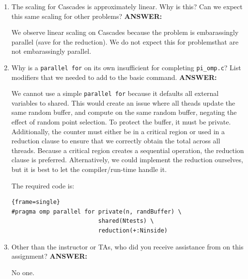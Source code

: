 \documentclass[letter]{article}
\begin{document}
\begin{enumerate}
        \item The scaling for Cascades is approximately linear. Why is this? Can we expect this same scaling for other problems?
        \textbf{ANSWER:} %

        We observe linear scaling on Cascades because the problem is embarassingly parallel (save for the reduction).  We do not expect this for problemsthat are not embarassingly parallel.

        \item Why is a \texttt{parallel for} on its own insufficient for completing \texttt{pi\_omp.c}?  List modifiers that we needed to add to the basic command.
        \textbf{ANSWER:} %

        We cannot use a simple \texttt{parallel for} because it defaults all external variables to shared.  This would create an issue where all theads update the same random buffer, and compute on the same random buffer, negating the effect of random point selection.  To protect the buffer, it must be private.  Additionally, the counter must either be in a critical region or used in a reduction clause to ensure that we correctly obtain the total across all threads.  Because a critical region creates a sequential operation, the reduction clause is preferred.  Alternatively, we could implement the reduction ourselves, but it is best to let the compiler/run-time handle it.

        The required code is:

        \begin{lstlisting}{frame=single}
#pragma omp parallel for private(n, randBuffer) \
                         shared(Ntests) \
                         reduction(+:Ninside)
        \end{lstlisting}

        \item Other than the instructor or TAs, who did you receive assistance from on this assignment?
        \textbf{ANSWER:} %
        
        No one.

    \end{enumerate}
\end{document}
